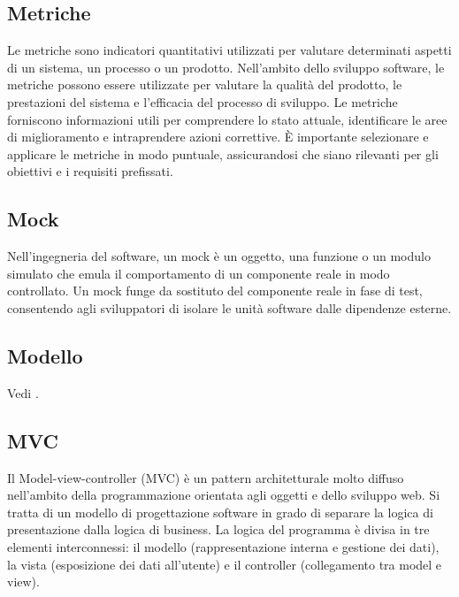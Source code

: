\vspace{2em}
\subsection*{Metriche}
\par Le metriche sono indicatori quantitativi utilizzati per valutare determinati aspetti di un sistema, un processo o un prodotto. Nell'ambito dello sviluppo software, le metriche possono essere utilizzate per valutare la qualità del prodotto, le prestazioni del sistema e l'efficacia del processo di sviluppo. Le metriche forniscono informazioni utili per comprendere lo stato attuale, identificare le aree di miglioramento e intraprendere azioni correttive. È importante selezionare e applicare le metriche in modo puntuale, assicurandosi che siano rilevanti per gli obiettivi e i requisiti prefissati.

\vspace{2em}
\subsection*{Mock}
\par Nell'ingegneria del software, un mock è un oggetto, una funzione o un modulo simulato che emula il comportamento di un componente reale in modo controllato. Un mock funge da sostituto del componente reale in fase di test, consentendo agli sviluppatori di isolare le unità software dalle dipendenze esterne.

\vspace{2em}
\subsection*{Modello}
\par Vedi .

\vspace{2em}
\subsection*{MVC}
\par Il Model-view-controller (MVC) è un pattern architetturale molto diffuso nell'ambito della programmazione orientata agli oggetti e dello sviluppo web. Si tratta di un modello di progettazione software in grado di separare la logica di presentazione dalla logica di business. La logica del programma è divisa in tre elementi interconnessi: il modello (rappresentazione interna e gestione dei dati), la vista (esposizione dei dati all'utente) e il controller (collegamento tra model e view).
